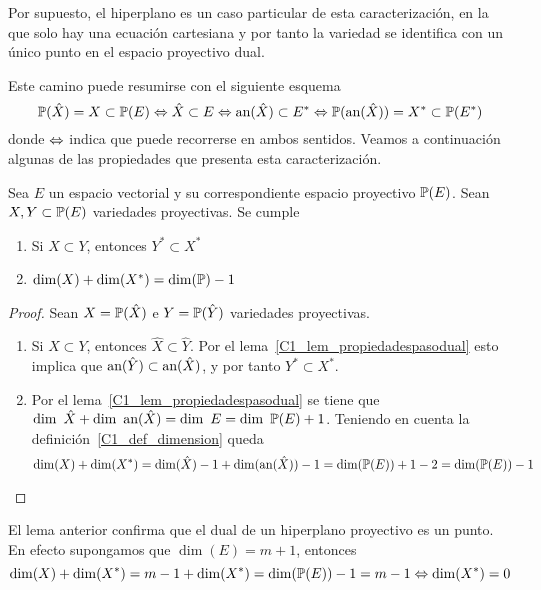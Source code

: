 Por supuesto, el hiperplano es un caso particular de esta caracterización, en la que solo hay una ecuación cartesiana y por tanto la variedad se identifica con un único punto en el espacio proyectivo dual.

Este camino puede resumirse con el siguiente esquema
\begin{equation}
\mathbb{P}(\hat{X})=X\subset\mathbb{P}(E)\Leftrightarrow \hat{X}\subset E\Leftrightarrow \text{an}(\hat{X})\subset E^*\Leftrightarrow \mathbb{P}(\text{an}(\hat{X}))=X^*\subset \mathbb{P}(E^*)
\end{equation}
donde $\Leftrightarrow$ indica que puede recorrerse en ambos sentidos.
Veamos a continuación algunas de las propiedades que presenta esta caracterización.
\begin{lem}
	\label{C1_lem_propiedadesPasoProyectivoDual}
	Sea $E$ un espacio vectorial y su correspondiente espacio proyectivo $\mathbb{P}(E)$. Sean $X,Y\subset\mathbb{P}(E)$ variedades proyectivas. Se cumple
	\begin{enumerate}
		\item Si $X\subset Y$, entonces $Y^*\subset X^*$
		\item $\dim(X)+\dim(X^*)=\dim(\mathbb{P})-1$
	\end{enumerate}
\end{lem}
\begin{proof}
	Sean $X=\mathbb{P}(\hat{X})$ e $Y=\mathbb{P}(\hat{Y})$ variedades proyectivas.
	\begin{enumerate}
		\item Si $X\subset Y$, entonces $\hat{X}\subset\hat{Y}$. Por el lema~\ref{C1_lem_propiedadespasodual} esto implica que $\text{an}(\hat{Y})\subset \text{an}(\hat{X})$, y por tanto $Y^*\subset X^*$.
		
		\item Por el lema~\ref{C1_lem_propiedadespasodual} se tiene que $\dim \ \hat{X}+\dim \ \an{\hat{X}}=\dim \ E=\dim \ \proy(E)+1$. Teniendo en cuenta la definición~\ref{C1_def_dimension} queda
		\begin{equation*}
		\dim(X)+\dim(X^*)=\dim(\hat{X})-1+\dim(\text{an}(\hat{X}))-1=\dim(\mathbb{P}(E))+1-2=\dim(\mathbb{P}(E))-1
		\end{equation*}
	\end{enumerate}
\end{proof}
\begin{obs}
	El lema anterior confirma que el dual de un hiperplano proyectivo es un punto. En efecto supongamos que $\dim(E)=m+1$, entonces
	\begin{equation*}
	\dim(X)+\dim(X^*)=m-1+\dim(X^*)=\dim(\mathbb{P}(E))-1=m-1\Leftrightarrow \dim(X^*)=0
	\end{equation*}
\end{obs}
